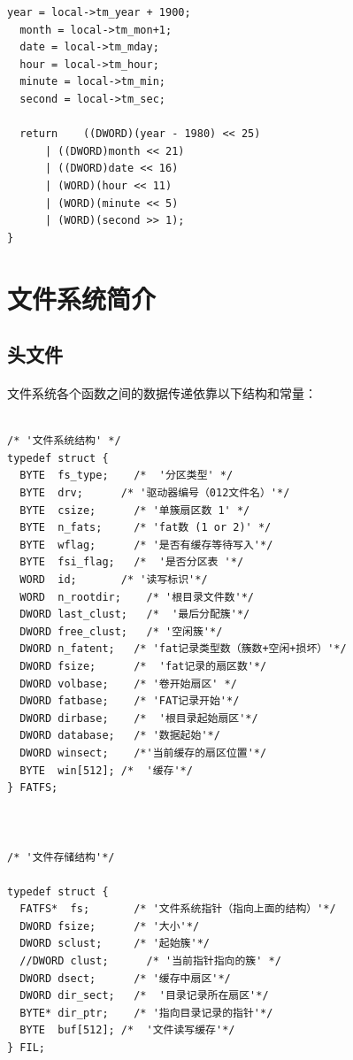 \documentclass{report}
\begin{document}
\begin{CJK}{GBK}{hei}
\begin{lstlisting}[language={[ANSI]C}]
  year = local->tm_year + 1900;
  month = local->tm_mon+1;
  date = local->tm_mday;
  hour = local->tm_hour;
  minute = local->tm_min;
  second = local->tm_sec;

  return    ((DWORD)(year - 1980) << 25)
      | ((DWORD)month << 21)
      | ((DWORD)date << 16)
      | (WORD)(hour << 11)
      | (WORD)(minute << 5)
      | (WORD)(second >> 1);
}

\end{lstlisting}

\section{文件系统简介}
\subsection{头文件}
\paragraph{} 文件系统各个函数之间的数据传递依靠以下结构和常量：
\begin{lstlisting}[language={[ANSI]C}]

/* '文件系统结构' */
typedef struct {
  BYTE  fs_type;    /*  '分区类型' */
  BYTE  drv;      /* '驱动器编号（012文件名）'*/
  BYTE  csize;      /* '单簇扇区数 1' */
  BYTE  n_fats;     /* 'fat数 (1 or 2)' */
  BYTE  wflag;      /* '是否有缓存等待写入'*/
  BYTE  fsi_flag;   /*  '是否分区表 '*/
  WORD  id;       /* '读写标识'*/
  WORD  n_rootdir;    /* '根目录文件数'*/
  DWORD last_clust;   /*  '最后分配簇'*/
  DWORD free_clust;   /* '空闲簇'*/
  DWORD n_fatent;   /* 'fat记录类型数（簇数+空闲+损坏）'*/
  DWORD fsize;      /*  'fat记录的扇区数'*/
  DWORD volbase;    /* '卷开始扇区' */
  DWORD fatbase;    /* 'FAT记录开始'*/
  DWORD dirbase;    /*  '根目录起始扇区'*/
  DWORD database;   /* '数据起始'*/
  DWORD winsect;    /*'当前缓存的扇区位置'*/
  BYTE  win[512]; /*  '缓存'*/
} FATFS;



/* '文件存储结构'*/

typedef struct {
  FATFS*  fs;       /* '文件系统指针（指向上面的结构）'*/
  DWORD fsize;      /* '大小'*/
  DWORD sclust;     /* '起始簇'*/
  //DWORD clust;      /* '当前指针指向的簇' */
  DWORD dsect;      /* '缓存中扇区'*/
  DWORD dir_sect;   /*  '目录记录所在扇区'*/
  BYTE* dir_ptr;    /* '指向目录记录的指针'*/
  BYTE  buf[512]; /*  '文件读写缓存'*/
} FIL;




\end{lstlisting}
\end{CJK}
\end{document}
